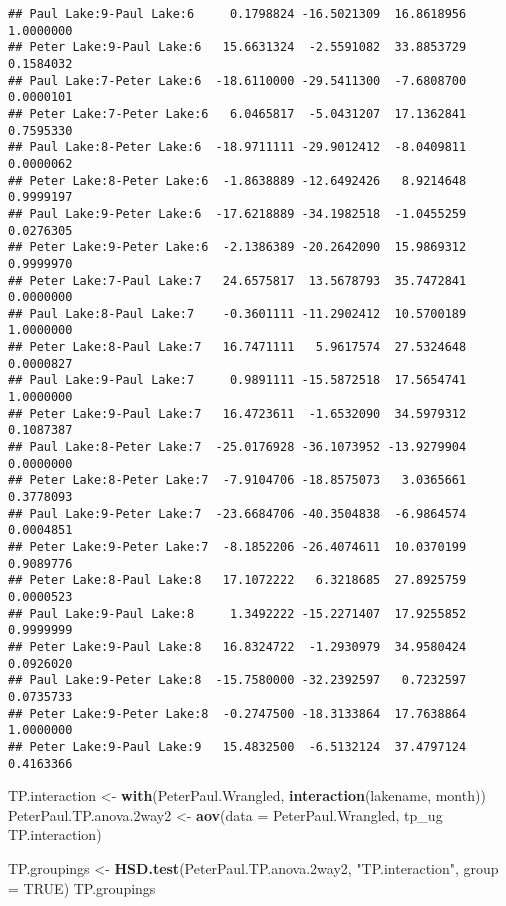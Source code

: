 \documentclass[]{article}
\newenvironment{Shaded}{\begin{snugshade}}{\end{snugshade}}
\newcommand{\DataTypeTok}[1]{\textcolor[rgb]{0.13,0.29,0.53}{#1}}
\newcommand{\FloatTok}[1]{\textcolor[rgb]{0.00,0.00,0.81}{#1}}
\newcommand{\KeywordTok}[1]{\textcolor[rgb]{0.13,0.29,0.53}{\textbf{#1}}}
\newcommand{\NormalTok}[1]{#1}
\newcommand{\OperatorTok}[1]{\textcolor[rgb]{0.81,0.36,0.00}{\textbf{#1}}}
\newcommand{\OtherTok}[1]{\textcolor[rgb]{0.56,0.35,0.01}{#1}}
\newcommand{\StringTok}[1]{\textcolor[rgb]{0.31,0.60,0.02}{#1}}
\begin{document}
\begin{verbatim}
## Paul Lake:9-Paul Lake:6     0.1798824 -16.5021309  16.8618956 1.0000000
## Peter Lake:9-Paul Lake:6   15.6631324  -2.5591082  33.8853729 0.1584032
## Paul Lake:7-Peter Lake:6  -18.6110000 -29.5411300  -7.6808700 0.0000101
## Peter Lake:7-Peter Lake:6   6.0465817  -5.0431207  17.1362841 0.7595330
## Paul Lake:8-Peter Lake:6  -18.9711111 -29.9012412  -8.0409811 0.0000062
## Peter Lake:8-Peter Lake:6  -1.8638889 -12.6492426   8.9214648 0.9999197
## Paul Lake:9-Peter Lake:6  -17.6218889 -34.1982518  -1.0455259 0.0276305
## Peter Lake:9-Peter Lake:6  -2.1386389 -20.2642090  15.9869312 0.9999970
## Peter Lake:7-Paul Lake:7   24.6575817  13.5678793  35.7472841 0.0000000
## Paul Lake:8-Paul Lake:7    -0.3601111 -11.2902412  10.5700189 1.0000000
## Peter Lake:8-Paul Lake:7   16.7471111   5.9617574  27.5324648 0.0000827
## Paul Lake:9-Paul Lake:7     0.9891111 -15.5872518  17.5654741 1.0000000
## Peter Lake:9-Paul Lake:7   16.4723611  -1.6532090  34.5979312 0.1087387
## Paul Lake:8-Peter Lake:7  -25.0176928 -36.1073952 -13.9279904 0.0000000
## Peter Lake:8-Peter Lake:7  -7.9104706 -18.8575073   3.0365661 0.3778093
## Paul Lake:9-Peter Lake:7  -23.6684706 -40.3504838  -6.9864574 0.0004851
## Peter Lake:9-Peter Lake:7  -8.1852206 -26.4074611  10.0370199 0.9089776
## Peter Lake:8-Paul Lake:8   17.1072222   6.3218685  27.8925759 0.0000523
## Paul Lake:9-Paul Lake:8     1.3492222 -15.2271407  17.9255852 0.9999999
## Peter Lake:9-Paul Lake:8   16.8324722  -1.2930979  34.9580424 0.0926020
## Paul Lake:9-Peter Lake:8  -15.7580000 -32.2392597   0.7232597 0.0735733
## Peter Lake:9-Peter Lake:8  -0.2747500 -18.3133864  17.7638864 1.0000000
## Peter Lake:9-Paul Lake:9   15.4832500  -6.5132124  37.4797124 0.4163366
\end{verbatim}

\begin{Shaded}
\begin{Highlighting}[]
\NormalTok{TP.interaction <-}\StringTok{ }\KeywordTok{with}\NormalTok{(PeterPaul.Wrangled, }
                       \KeywordTok{interaction}\NormalTok{(lakename, month))}
\NormalTok{PeterPaul.TP.anova}\FloatTok{.2}\NormalTok{way2 <-}\StringTok{ }\KeywordTok{aov}\NormalTok{(}\DataTypeTok{data =}\NormalTok{ PeterPaul.Wrangled, }
\NormalTok{                                tp_ug }\OperatorTok{~}\StringTok{ }\NormalTok{TP.interaction)}

\NormalTok{TP.groupings <-}\StringTok{ }\KeywordTok{HSD.test}\NormalTok{(PeterPaul.TP.anova}\FloatTok{.2}\NormalTok{way2, }
                         \StringTok{"TP.interaction"}\NormalTok{, }\DataTypeTok{group =} \OtherTok{TRUE}\NormalTok{)}
\NormalTok{TP.groupings}
\end{Highlighting}
\end{Shaded}
\end{document}
